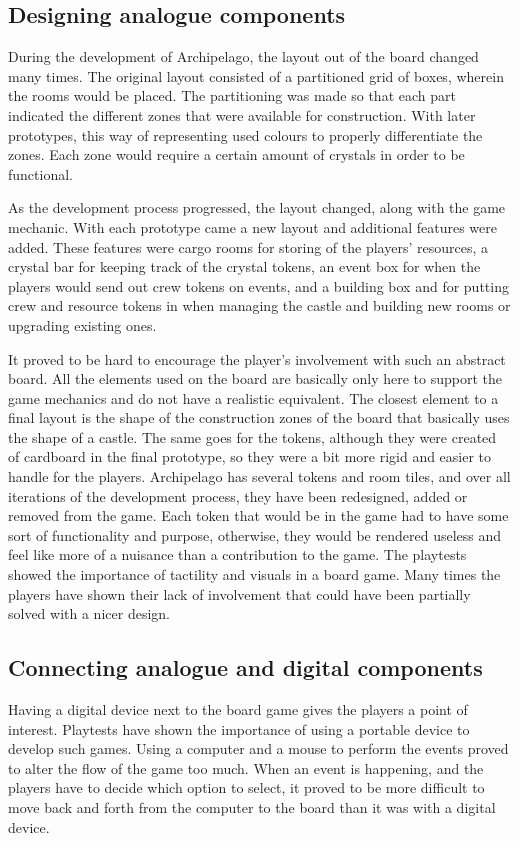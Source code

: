 \subsection{Designing analogue components}
During the development of Archipelago, the layout out of the board changed many times. The original layout consisted of a partitioned grid of boxes, wherein the rooms would be placed. The partitioning was made so that each part indicated the different zones that were available for construction. With later prototypes, this way of representing used colours to properly differentiate the zones. Each zone would require a certain amount of crystals in order to be functional. 

As the development process progressed, the layout changed, along with the game mechanic. With each prototype came a new layout and additional features were added. These features were cargo rooms for storing of the players' resources, a crystal bar for keeping track of the crystal tokens, an event box for when the players would send out crew tokens on events, and a building box and for putting crew and resource tokens in when managing the castle and building new rooms or upgrading existing ones. 

It proved to be hard to encourage the player's involvement with such an abstract board. All the elements used on the board are basically only here to support the game mechanics and do not have a realistic equivalent. The closest element to a final layout is the shape of the construction zones of the board that basically uses the shape of a castle. The same goes for the tokens, although they were created of cardboard in the final prototype, so they were a bit more rigid and easier to handle for the players. Archipelago has several tokens and room tiles, and over all iterations of the development process, they have been redesigned, added or removed from the game. Each token that would be in the game had to have some sort of functionality and purpose, otherwise, they would be rendered useless and feel like more of a nuisance than a contribution to the game. The playtests showed the importance of tactility and visuals in a board game. Many times the players have shown their lack of involvement that could have been partially solved with a nicer design.

\subsection{Connecting analogue and digital components}
Having a digital device next to the board game gives the players a point of interest. Playtests have shown the importance of using a portable device to develop such games. Using a computer and a mouse to perform the events proved to alter the flow of the game too much. When an event is happening, and the players have to decide which option to select, it proved to be more difficult to move back and forth from the computer to the board than it was with a digital device.

